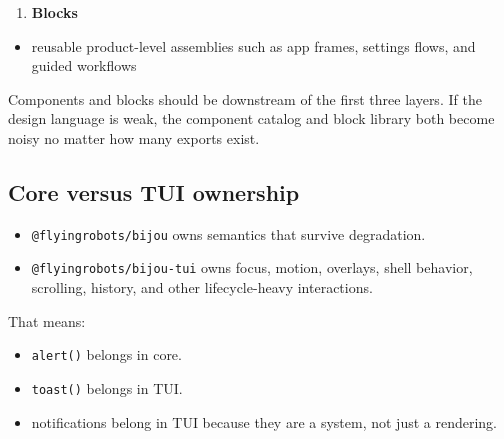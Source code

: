 \begin{enumerate}
\def\labelenumi{\arabic{enumi}.}
\setcounter{enumi}{4}
\tightlist
\item
  \textbf{Blocks}
\end{enumerate}

\begin{itemize}
\tightlist
\item
  reusable product-level assemblies such as app frames, settings flows, and guided workflows
\end{itemize}

Components and blocks should be downstream of the first three layers. If the design language is weak, the component catalog and block library both become noisy no matter how many exports exist.

\subsection{Core versus TUI ownership}\label{record-017-core-versus-tui-ownership}

\begin{itemize}
\tightlist
\item
  \texttt{@\allowbreak{}f\allowbreak{}l\allowbreak{}y\allowbreak{}i\allowbreak{}n\allowbreak{}g\allowbreak{}r\allowbreak{}o\allowbreak{}b\allowbreak{}o\allowbreak{}t\allowbreak{}s\allowbreak{}/\allowbreak{}b\allowbreak{}i\allowbreak{}j\allowbreak{}o\allowbreak{}u} owns semantics that survive degradation.
\item
  \texttt{@\allowbreak{}f\allowbreak{}l\allowbreak{}y\allowbreak{}i\allowbreak{}n\allowbreak{}g\allowbreak{}r\allowbreak{}o\allowbreak{}b\allowbreak{}o\allowbreak{}t\allowbreak{}s\allowbreak{}/\allowbreak{}b\allowbreak{}i\allowbreak{}j\allowbreak{}o\allowbreak{}u\allowbreak{}-\allowbreak{}t\allowbreak{}u\allowbreak{}i} owns focus, motion, overlays, shell behavior, scrolling, history, and other lifecycle-heavy interactions.
\end{itemize}

That means:

\begin{itemize}
\tightlist
\item
  \texttt{a\allowbreak{}l\allowbreak{}e\allowbreak{}r\allowbreak{}t\allowbreak{}(\allowbreak{})} belongs in core.
\item
  \texttt{t\allowbreak{}o\allowbreak{}a\allowbreak{}s\allowbreak{}t\allowbreak{}(\allowbreak{})} belongs in TUI.
\item
  notifications belong in TUI because they are a system, not just a rendering.
\end{itemize}

